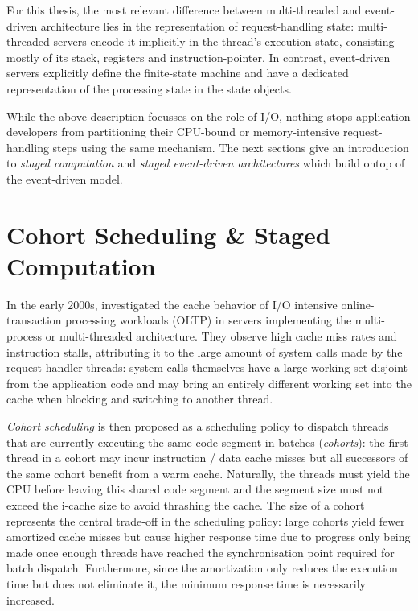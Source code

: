 \documentclass[12pt,a4paper]{book}
\begin{document}
For this thesis, the most relevant difference between multi-threaded and event-driven architecture lies in the representation of request-handling state:
multi-threaded servers encode it implicitly in the thread's execution state, consisting mostly of its stack, registers and instruction-pointer.
In contrast, event-driven servers explicitly define the finite-state machine and have a dedicated representation of the processing state in the state objects.

While the above description focusses on the role of I/O, nothing stops application developers from partitioning their CPU-bound or memory-intensive request-handling steps using the same mechanism.
The next sections give an introduction to \emph{staged computation} and \emph{staged event-driven architectures} which build ontop of the event-driven model.

\section{Cohort Scheduling \& Staged Computation}\label{ch:relwork:cohort}
In the early 2000s, \citeauthor*{cohort} investigated the cache behavior of I/O intensive online-transaction processing workloads (OLTP) in servers implementing the multi-process or multi-threaded architecture.
They observe high cache miss rates and instruction stalls, attributing it to the large amount of system calls made by the request handler threads:
system calls themselves have a large working set disjoint from the application code and may bring an entirely different working set into the cache when blocking and switching to another thread.~\cite{cohort}

\emph{Cohort scheduling} is then proposed as a scheduling policy to dispatch threads that are currently executing the same code segment in batches (\emph{cohorts}):
the first thread in a cohort may incur instruction / data cache misses but all successors of the same cohort benefit from a warm cache.
Naturally, the threads must yield the CPU before leaving this shared code segment and the segment size must not exceed the i-cache size to avoid thrashing the cache.
The size of a cohort represents the central trade-off in the scheduling policy: large cohorts yield fewer amortized cache misses but cause higher response time due to progress only being made once enough threads have reached the synchronisation point required for batch dispatch.
Furthermore, since the amortization only reduces the execution time but does not eliminate it, the minimum response time is necessarily increased.~\cite{cohort}
\end{document}
